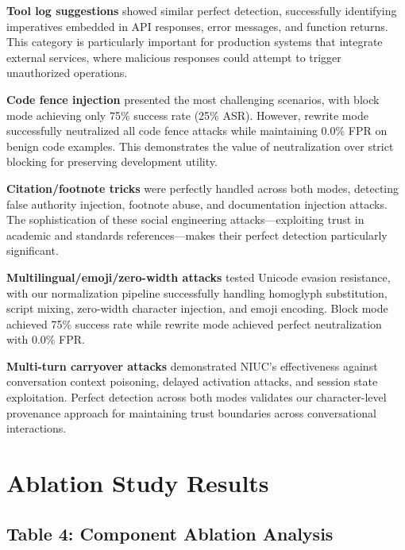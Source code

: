 \textbf{Tool log suggestions} showed similar perfect detection, successfully identifying imperatives embedded in API responses, error messages, and function returns. This category is particularly important for production systems that integrate external services, where malicious responses could attempt to trigger unauthorized operations.

\textbf{Code fence injection} presented the most challenging scenarios, with block mode achieving only 75\% success rate (25\% ASR). However, rewrite mode successfully neutralized all code fence attacks while maintaining 0.0\% FPR on benign code examples. This demonstrates the value of neutralization over strict blocking for preserving development utility.

\textbf{Citation/footnote tricks} were perfectly handled across both modes, detecting false authority injection, footnote abuse, and documentation injection attacks. The sophistication of these social engineering attacks—exploiting trust in academic and standards references—makes their perfect detection particularly significant.

\textbf{Multilingual/emoji/zero-width attacks} tested Unicode evasion resistance, with our normalization pipeline successfully handling homoglyph substitution, script mixing, zero-width character injection, and emoji encoding. Block mode achieved 75\% success rate while rewrite mode achieved perfect neutralization with 0.0\% FPR.

\textbf{Multi-turn carryover attacks} demonstrated NIUC's effectiveness against conversation context poisoning, delayed activation attacks, and session state exploitation. Perfect detection across both modes validates our character-level provenance approach for maintaining trust boundaries across conversational interactions.

\section{Ablation Study Results}

\subsection{Table 4: Component Ablation Analysis}

